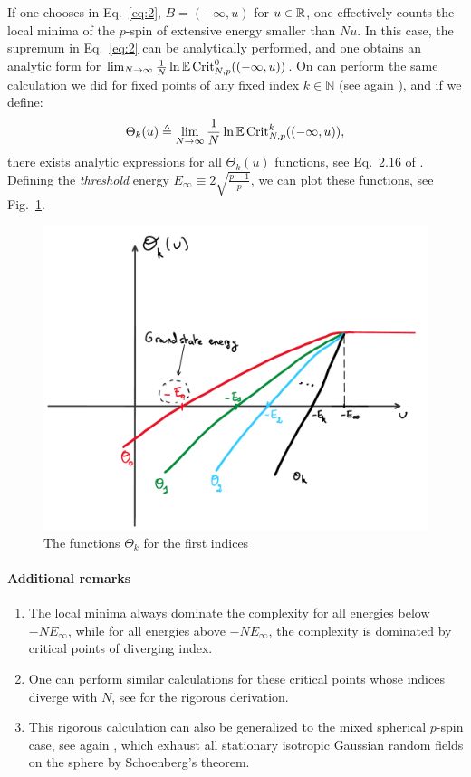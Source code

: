 \documentclass[amsmath,amssymb,nofootinbib,prd]{article}
\begin{document}
	If one chooses in Eq.~\ref{eq:2}, $B = (-\infty,u)$ for $u \in \mathbb{R}$, one effectively counts the local minima of the $p$-spin of extensive energy smaller than $Nu$. In this case, the supremum in Eq.~\ref{eq:2} can be analytically performed, and one obtains an analytic form for $\lim_{N \to \infty} \frac{1}{N} \ln \mathbb{E} \, \mathrm{Crit}_{N,p}^0((-\infty,u))$. On can perform the same calculation we did for fixed points of any fixed index $k \in \mathbb{N}$ (see again \cite{auffinger2013random}), and if we define:
	\begin{align}
	\Theta_k(u) \triangleq \lim_{N \to \infty} \frac{1}{N} \ln \mathbb{E} \, \mathrm{Crit}_{N,p}^k((-\infty,u)),
	\end{align}
	there exists analytic expressions for all $\Theta_k(u)$ functions, see Eq.~2.16 of \cite{auffinger2013random}. Defining the \emph{threshold} energy $E_\infty \equiv 2 \sqrt{\frac{p-1}{p}}$, we can plot these functions, see Fig.~\ref{fig:fig}.
		\begin{figure}
		\centering
	\includegraphics[scale=0.4]{figure.pdf}
	\caption{The functions $\Theta_k$ for the first indices}\label{fig:fig}
	\end{figure}

	
	\paragraph{Additional remarks}
	\begin{enumerate}
\item The local minima always dominate the complexity for all energies below $-N E_\infty$, while for all energies above $-N E_\infty$, the complexity is dominated by critical points of diverging index.
\item One can perform similar calculations for these critical points whose indices diverge with $N$, see \cite{auffinger2013complexity}  for the rigorous derivation.
\item This rigorous calculation can also be generalized to the mixed spherical $p$-spin case, see again \cite{auffinger2013complexity}, which exhaust all stationary isotropic Gaussian random fields on the sphere by Schoenberg's theorem.
	\end{enumerate}
	
 

\end{document}
